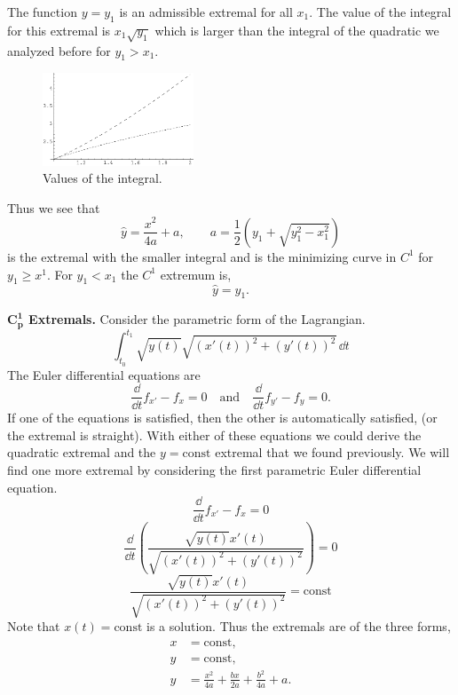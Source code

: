 \begin{Solution}
  The function $y = y_1$ is an admissible extremal for all $x_1$.  The value
  of the integral for this extremal is $x_1 \sqrt{y_1}$ which is larger than
  the integral of the quadratic we analyzed before for $y_1 > x_1$.

  \begin{figure}[h!]
    \begin{center}
      \includegraphics[width=0.4\textwidth]{cv/cv/twovals}
    \end{center}
    \caption{Values of the integral.}
    \label{twovals}
  \end{figure}

  Thus we see that 
  \[
  \boxed{
    \hat{y} = \frac{x^2}{4a} + a, \qquad
    a = \frac{1}{2} \left( y_1 + \sqrt{y_1^2 - x_1^2} \right)
    }
  \]
  is the extremal with the smaller integral and is the minimizing curve
  in $C^1$ for $y_1 \geq x^1$.  For $y_1 < x_1$ the $C^1$ extremum is,
  \[
  \boxed{ 
    \hat{y} = y_1.
    }
  \]






  \textbf{$\mathbf{C^1_p}$ Extremals.}
  Consider the parametric form of the Lagrangian.
  \[
  \int_{t_0}^{t_1} \sqrt{y(t)} \sqrt{(x'(t))^2 + (y'(t))^2}\,\dd t
  \]
  The Euler differential equations are
  \[
  \frac{\dd}{\dd t} f_{x'} - f_{x} = 0 \quad \mathrm{and} \quad
  \frac{\dd}{\dd t} f_{y'} - f_{y} = 0.
  \] 
  If one of the equations is satisfied, then the other is automatically 
  satisfied, (or the extremal is straight).  With either of these equations
  we could derive the quadratic extremal and the $y = \mathrm{const}$ extremal that
  we found previously.  We will find one more extremal by considering the
  first parametric Euler differential equation.
  \[
  \frac{\dd}{\dd t} f_{x'} - f_{x} = 0 
  \]
  \[
  \frac{\dd}{\dd t} \left( \frac{ \sqrt{y(t)} x'(t)}{\sqrt{(x'(t))^2 + (y'(t))^2}}
  \right) = 0
  \]
  \[
  \frac{ \sqrt{y(t)} x'(t)}{\sqrt{(x'(t))^2 + (y'(t))^2}} = \mathrm{const}
  \]
  Note that $x(t) = \mathrm{const}$ is a solution.
  Thus the extremals are of the three forms,
  \begin{align*}
    x &= \mathrm{const}, \\
    y &= \mathrm{const}, \\
    y &= \frac{x^2}{4a} + \frac{b x}{2 a} + \frac{b^2}{4a} + a.
  \end{align*}


\end{Solution}
